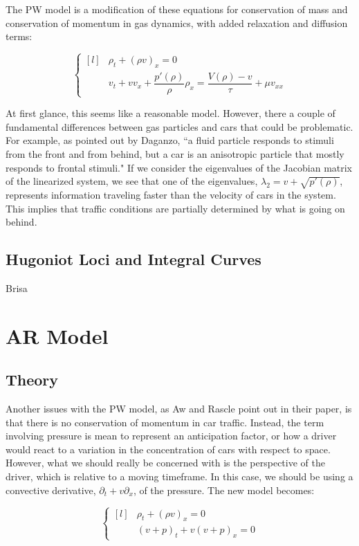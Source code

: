 \documentclass{article}
\begin{document}
The PW model is a modification of these equations for conservation of mass and conservation of momentum in gas dynamics, with added relaxation and diffusion terms: 

\[ \left\{ \begin{matrix*}[l] & \rho_t + (\rho v)_x = 0 \\[1ex] & v_t + v v_x + \dfrac{p'(\rho)}{\rho} \rho_x = \dfrac{V(\rho) - v}{\tau} + \mu v_{xx} \end{matrix*} \right. \]

At first glance, this seems like a reasonable model.  However, there a couple of fundamental differences between gas particles and cars that could be problematic.  For example, as pointed out by Daganzo, ``a fluid particle responds to stimuli from the front and from behind, but a car is an anisotropic particle that mostly responds to frontal stimuli."  If we consider the eigenvalues of the Jacobian matrix of the linearized system, we see that one of the eigenvalues, $\lambda_2 = v + \sqrt{p'(\rho)}$, represents information traveling faster than the velocity of cars in the system.  This implies that traffic conditions are partially determined by what is going on behind.

\subsection{Hugoniot Loci and Integral Curves}
Brisa

\section{AR Model}
\subsection{Theory}
Another issues with the PW model, as Aw and Rascle point out in their paper, is that there is no conservation of momentum in car traffic.  Instead, the term involving pressure is mean to represent an anticipation factor, or how a driver would react to a variation in the concentration of cars with respect to space.   However, what we should really be concerned with is the perspective of the driver, which is relative to a moving timeframe.  In this case, we should be using a convective derivative, $\partial_t + v \partial_x$, of the pressure.  The new model becomes:

\[ \left\{ \begin{matrix*}[l] & \rho_t + (\rho v)_x = 0 \\[1ex] & (v + p)_t + v (v + p)_x = 0 \end{matrix*} \right. \]
\end{document}
